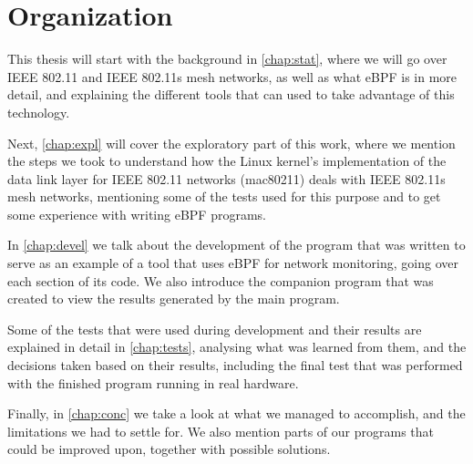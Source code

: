 \section{Organization}

This thesis will start with the background in \autoref{chap:stat}, where we will
go over \ac{IEEE} 802.11 and \ac{IEEE} 802.11s mesh networks, as well as what
eBPF is in more detail, and explaining the different tools that can used to take
advantage of this technology.

Next, \autoref{chap:expl} will cover the exploratory part of this work, where we
mention the steps we took to understand how the Linux kernel's implementation of
the data link layer for \ac{IEEE} 802.11 networks (mac80211) deals with
\ac{IEEE} 802.11s mesh networks, mentioning some of the tests used for this
purpose and to get some experience with writing eBPF programs.

In \autoref{chap:devel} we talk about the development of the program that was
written to serve as an example of a tool that uses eBPF for network monitoring,
going over each section of its code. We also introduce the companion program
that was created to view the results generated by the main program.

Some of the tests that were used during development and their results are
explained in detail in \autoref{chap:tests}, analysing what was learned from
them, and the decisions taken based on their results, including the final test
that was performed with the finished program running in real hardware.

Finally, in \autoref{chap:conc} we take a look at what we managed to accomplish,
and the limitations we had to settle for. We also mention parts of our programs
that could be improved upon, together with possible solutions.
